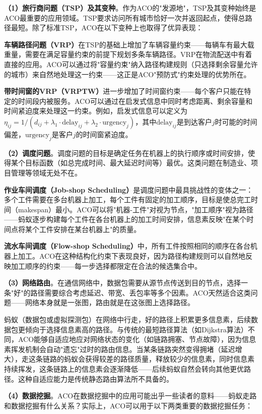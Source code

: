 \documentclass[lang=cn,zihao=-4,a4paper,fontset=windows]{beautybook}
\begin{document}
\textbf{（1）旅行商问题（TSP）及其变种}。作为ACO的"发源地"，TSP及其变种始终是ACO最重要的应用领域。TSP要求访问所有城市恰好一次并返回起点，使得总路径最短。除了标准TSP，ACO在以下变种上也取得了优异表现：

\textbf{车辆路径问题（VRP）}在TSP的基础上增加了车辆容量约束——每辆车有最大载重量，需要在满足容量约束的前提下规划多条车辆路径。VRP在物流配送中有着直接的应用。ACO可以通过将"容量约束"纳入路径构建规则（只选择剩余容量允许的城市）来自然地处理这一约束——这正是ACO"预防式"约束处理的优势所在。

\textbf{带时间窗的VRP（VRPTW）}进一步增加了时间窗约束——每个客户只能在特定的时间段内被服务。ACO可以通过在启发式信息中同时考虑距离、剩余容量和时间紧迫度来处理这一约束。例如，启发式信息可以定义为$\eta_{ij} = 1/(d_{ij} + \lambda_1 \cdot \text{delay}_{ij} + \lambda_2 \cdot \text{urgency}_j)$，其中$\text{delay}_{ij}$是到达客户$j$时可能的时间偏差，$\text{urgency}_j$是客户$j$的时间窗紧迫度。

\textbf{（2）调度问题}。调度问题的目标是确定任务在机器上的执行顺序或时间安排，使得某个目标函数（如总完成时间、最大延迟时间等）最优。这类问题在制造业、项目管理等领域无处不在。

\textbf{作业车间调度（Job-shop Scheduling）}是调度问题中最具挑战性的变体之一：多个工件需要在多台机器上加工，每个工件有固定的加工顺序，目标是使总完工时间（makespan）最小。ACO可以将"机器-工件"对视为节点，"加工顺序"视为路径——蚂蚁逐步构建每个工件在各台机器上的加工时间安排，信息素反映"在某个时间点将某个工件安排在某台机器上"的质量。

\textbf{流水车间调度（Flow-shop Scheduling）}中，所有工件按照相同的顺序在各台机器上加工。ACO在这种结构化约束下表现良好，因为路径构建规则可以自然地反映加工顺序的约束——每一步选择都限定在合法的候选集合中。

\textbf{（3）网络路由}。在通信网络中，数据包需要从源节点传送到目的节点，选择一条"好"的路径需要综合考虑延迟、带宽、丢包率等多个因素。ACO天然适合这类问题——网络本身就是一张图，路由就是在这张图上选择路径。

蚂蚁（数据包或虚拟探测包）在网络中行走，好的路径上积累更多信息素，后续数据包更倾向于选择信息素高的路径。与传统的最短路径算法（如Dijkstra算法）不同，ACO能够自适应地应对网络状态的变化（如链路拥塞、节点故障），因为信息素挥发机制会自动"遗忘"过时的路由信息。当某条链路突然变得拥堵（延迟增大），走这条链路的蚂蚁会获得较差的路径质量，释放较少的信息素，同时信息素持续挥发，这条链路上的信息素会逐渐降低——后续蚂蚁自然会转向其他更优路径。这种自适应能力是传统静态路由算法所不具备的。

\textbf{（4）数据挖掘}。ACO在数据挖掘中的应用可能出乎一些读者的意料——蚂蚁走路和数据挖掘有什么关系？实际上，ACO可以用于以下两类重要的数据挖掘任务：
\end{document}

